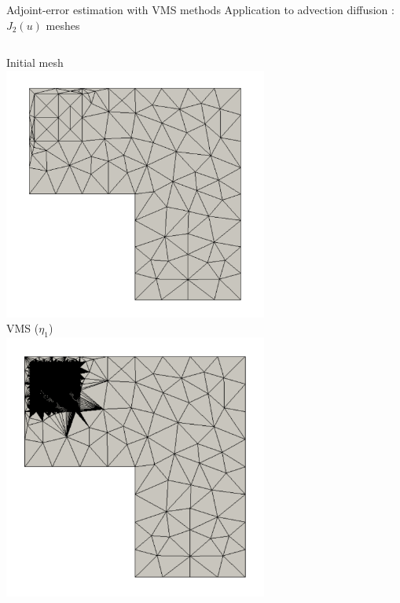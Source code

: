 \documentclass[fleqn]{beamer}
\begin{document}
\begin{frame}{Adjoint-error estimation with VMS methods}
{Application to advection diffusion : $J_2(u)$ meshes}

\begin{columns}
\begin{column}{0.5\textwidth}
\centering
Initial mesh \\
\includegraphics[width=0.65\textwidth]{../img/vms_lshape_square_initial.pdf} \\
VMS ($\eta_1$) \\
\includegraphics[width=0.65\textwidth]{../img/vms_lshape_square_vms1_final.pdf} 
\end{column}


\end{columns}
\end{frame}
\end{document}
